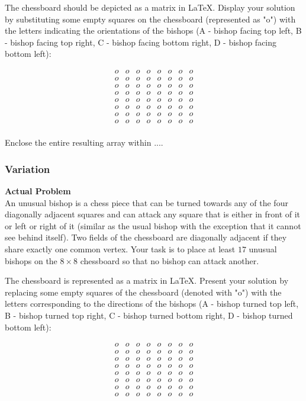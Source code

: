 The chessboard should be depicted as a matrix in LaTeX. Display your solution by substituting some empty squares on the chessboard (represented as "o") with the letters indicating the orientations of the bishops (A - bishop facing top left, B - bishop facing top right, C - bishop facing bottom right, D - bishop facing bottom left):

$$\begin{array}{cccccccc}
o & o & o & o & o & o & o & o \\
o & o & o & o & o & o & o & o \\
o & o & o & o & o & o & o & o \\
o & o & o & o & o & o & o & o \\
o & o & o & o & o & o & o & o \\
o & o & o & o & o & o & o & o \\
o & o & o & o & o & o & o & o \\
o & o & o & o & o & o & o & o \\
\end{array}$$

Enclose the entire resulting array within $\boxed{...}$.

\subsubsection{Variation}
\textbf{Actual Problem}\\
An unusual bishop is a chess piece that can be turned towards any of the four diagonally adjacent squares and can attack any square that is either in front of it or left or right of it (similar as the usual bishop with the exception that it cannot see behind itself).
Two fields of the chessboard are diagonally adjacent if they share exactly one common vertex. Your task is to place at least $17$ unusual bishops on the $8 \times 8$ chessboard so that no bishop can attack another.

The chessboard is represented as a matrix in LaTeX. 
Present your solution by replacing some empty squares of the chessboard (denoted with "o") with the letters corresponding to the directions of the bishops (A - bishop turned top left, B - bishop turned top right, C - bishop turned bottom right, D - bishop turned bottom left):

$$\begin{array}{cccccccc}
o & o & o & o & o & o & o & o \\
o & o & o & o & o & o & o & o \\
o & o & o & o & o & o & o & o \\
o & o & o & o & o & o & o & o \\
o & o & o & o & o & o & o & o \\
o & o & o & o & o & o & o & o \\
o & o & o & o & o & o & o & o \\
o & o & o & o & o & o & o & o \\
\end{array}$$

